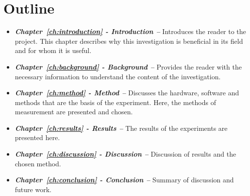 \section{Outline}
\begin{itemize}
    \item \textit{\textbf{Chapter~\ref{ch:introduction} - Introduction --}} Introduces the reader to the project. This chapter describes why this investigation is beneficial in its field and for whom it is useful.
    \item \textit{\textbf{Chapter~\ref{ch:background} - Background --}} Provides the reader with the necessary information to understand the content of the investigation.
    \item \textit{\textbf{Chapter~\ref{ch:method} - Method --}} Discusses the hardware, software and methods that are the basis of the experiment. Here, the methods of measurement are presented and chosen.
    \item \textit{\textbf{Chapter~\ref{ch:results} - Results --}} The results of the experiments are presented here.
    \item \textit{\textbf{Chapter~\ref{ch:discussion} - Discussion --}} Discussion of results and the chosen method.
    \item \textit{\textbf{Chapter~\ref{ch:conclusion} - Conclusion --}} Summary of discussion and future work.
\end{itemize}
